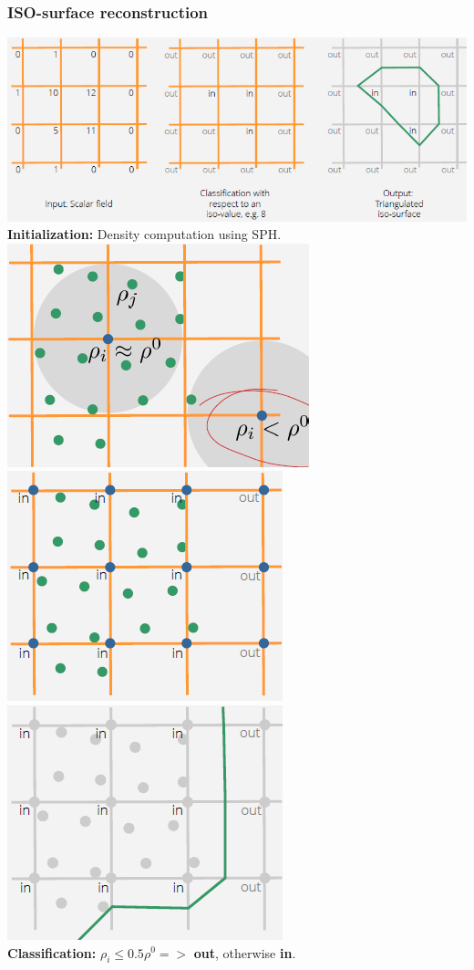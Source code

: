\documentclass{article}
\begin{document}
\subsubsection{ISO-surface reconstruction}
\includegraphics[scale=0.5]{7.png}\\
\textbf{Initialization: } Density computation using SPH.\\
\includegraphics[scale=0.6]{8.png}
\includegraphics[scale=0.6]{9.png}
\includegraphics[scale=0.6]{10.png}\\
\textbf{Classification: } $\rho_i \le 0.5 \rho^0=>$ \textbf{out}, otherwise \textbf{in}.
\newpage
\end{document}
